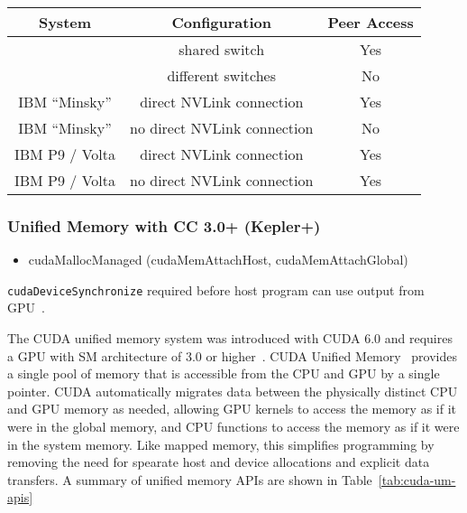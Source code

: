 \begin{table}[h]
	\centering
	\caption[]{}
	\label{tab:cuda-peer-topology}
	\begin{tabular}{|c|c|c|}
		\hline
		\textbf{System} & \textbf{Configuration} & \textbf{Peer Access} \\ \hline
		\todo{system} & shared switch  & Yes \\ \hline
		\todo{system} & different switches  & No \\ \hline
		IBM ``Minsky'' & direct NVLink connection  & Yes \\ \hline
		IBM ``Minsky'' & no direct NVLink connection  & No \\ \hline
		IBM P9 / Volta & direct NVLink connection  & Yes \\ \hline
		IBM P9 / Volta & no direct NVLink connection  & Yes \\ \hline

	\end{tabular}
\end{table}



\subsubsection{Unified Memory with CC 3.0+ (Kepler+)}

\begin{itemize}
	\item cudaMallocManaged (cudaMemAttachHost, cudaMemAttachGlobal)
\end{itemize}


\texttt{cudaDeviceSynchronize} required before host program can use output from GPU~\cite{nvidia2014cuda60}.

The CUDA unified memory system was introduced with CUDA 6.0 and requires a GPU with SM architecture of 3.0 or higher~\cite{nvidia2014cuda60}.
CUDA Unified Memory~\cite{harris2013cudaunifiedmemory} provides a single pool of memory that is accessible from the CPU and GPU by a single pointer.
CUDA automatically migrates data between the physically distinct CPU and GPU memory as needed, allowing GPU kernels to access the memory as if it were in the global memory, and CPU functions to access the memory as if it were in the system memory.
Like mapped memory, this simplifies programming by removing the need for spearate host and device allocations and explicit data transfers.
A summary of unified memory APIs are shown in Table~\ref{tab:cuda-um-apis}

